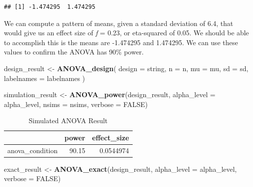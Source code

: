 \documentclass[]{book}
\newenvironment{Shaded}{\begin{snugshade}}{\end{snugshade}}
\newcommand{\DataTypeTok}[1]{\textcolor[rgb]{0.13,0.29,0.53}{#1}}
\newcommand{\KeywordTok}[1]{\textcolor[rgb]{0.13,0.29,0.53}{\textbf{#1}}}
\newcommand{\NormalTok}[1]{#1}
\newcommand{\OtherTok}[1]{\textcolor[rgb]{0.56,0.35,0.01}{#1}}
\newcommand{\StringTok}[1]{\textcolor[rgb]{0.31,0.60,0.02}{#1}}
\begin{document}
\begin{verbatim}
## [1] -1.474295  1.474295
\end{verbatim}

We can compute a pattern of means, given a standard deviation of 6.4, that would give us an effect size of \emph{f} = 0.23, or eta-squared of 0.05. We should be able to accomplish this is the means are -1.474295 and 1.474295. We can use these values to confirm the ANOVA has 90\% power.

\begin{Shaded}
\begin{Highlighting}[]
\NormalTok{design_result <-}\StringTok{ }\KeywordTok{ANOVA_design}\NormalTok{(}
  \DataTypeTok{design =}\NormalTok{ string,}
  \DataTypeTok{n =}\NormalTok{ n,}
  \DataTypeTok{mu =}\NormalTok{ mu,}
  \DataTypeTok{sd =}\NormalTok{ sd,}
  \DataTypeTok{labelnames =}\NormalTok{ labelnames}
\NormalTok{  )}
\end{Highlighting}
\end{Shaded}

\begin{Shaded}
\begin{Highlighting}[]
\NormalTok{simulation_result <-}\StringTok{ }\KeywordTok{ANOVA_power}\NormalTok{(design_result, }
                                 \DataTypeTok{alpha_level =}\NormalTok{ alpha_level, }
                                 \DataTypeTok{nsims =}\NormalTok{ nsims,}
                                 \DataTypeTok{verbose =} \OtherTok{FALSE}\NormalTok{)}
\end{Highlighting}
\end{Shaded}

\begin{table}[!h]

\caption{\label{tab:unnamed-chunk-19}Simulated ANOVA Result}
\centering
\begin{tabular}{l|r|r}
\hline
  & power & effect\_size\\
\hline
anova\_condition & 90.15 & 0.0544974\\
\hline
\end{tabular}
\end{table}

\begin{Shaded}
\begin{Highlighting}[]
\NormalTok{exact_result <-}\StringTok{ }\KeywordTok{ANOVA_exact}\NormalTok{(design_result,}
                            \DataTypeTok{alpha_level =}\NormalTok{ alpha_level,}
                            \DataTypeTok{verbose =} \OtherTok{FALSE}\NormalTok{)}
\end{Highlighting}
\end{Shaded}
\end{document}
